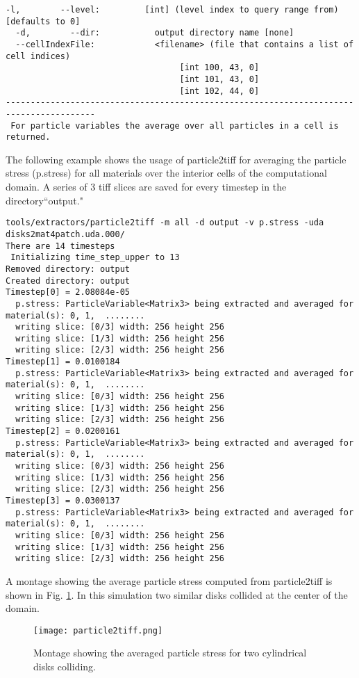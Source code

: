 \begin{Verbatim}[fontsize=\footnotesize]
  -l,        --level:         [int] (level index to query range from) [defaults to 0]
  -d,        --dir:           output directory name [none]
  --cellIndexFile:            <filename> (file that contains a list of cell indices)
                                   [int 100, 43, 0]
                                   [int 101, 43, 0]
                                   [int 102, 44, 0]
----------------------------------------------------------------------------------------
 For particle variables the average over all particles in a cell is returned.
 \end{Verbatim}

The following example shows the usage of particle2tiff for averaging the particle stress (p.stress)
for all materials over the interior cells of the computational domain.  A series of 3 tiff slices
are saved for every timestep in the directory``output."
\begin{Verbatim}[fontsize=\scriptsize]
tools/extractors/particle2tiff -m all -d output -v p.stress -uda disks2mat4patch.uda.000/
There are 14 timesteps
 Initializing time_step_upper to 13
Removed directory: output
Created directory: output
Timestep[0] = 2.08084e-05
  p.stress: ParticleVariable<Matrix3> being extracted and averaged for material(s): 0, 1,  ........
  writing slice: [0/3] width: 256 height 256
  writing slice: [1/3] width: 256 height 256
  writing slice: [2/3] width: 256 height 256
Timestep[1] = 0.0100184
  p.stress: ParticleVariable<Matrix3> being extracted and averaged for material(s): 0, 1,  ........
  writing slice: [0/3] width: 256 height 256
  writing slice: [1/3] width: 256 height 256
  writing slice: [2/3] width: 256 height 256
Timestep[2] = 0.0200161
  p.stress: ParticleVariable<Matrix3> being extracted and averaged for material(s): 0, 1,  ........
  writing slice: [0/3] width: 256 height 256
  writing slice: [1/3] width: 256 height 256
  writing slice: [2/3] width: 256 height 256
Timestep[3] = 0.0300137
  p.stress: ParticleVariable<Matrix3> being extracted and averaged for material(s): 0, 1,  ........
  writing slice: [0/3] width: 256 height 256
  writing slice: [1/3] width: 256 height 256
  writing slice: [2/3] width: 256 height 256
\end{Verbatim}
A montage showing the average particle stress computed from particle2tiff is shown
in Fig. \ref{fig:p2tiff}.  In this simulation two similar disks collided at the center of the domain.
\vspace{-0.5in}
\begin{figure}
  \texttt{[image: particle2tiff.png]}
  \caption{Montage showing the averaged particle stress for two cylindrical disks colliding.}
  \label{fig:p2tiff}
\end{figure}



